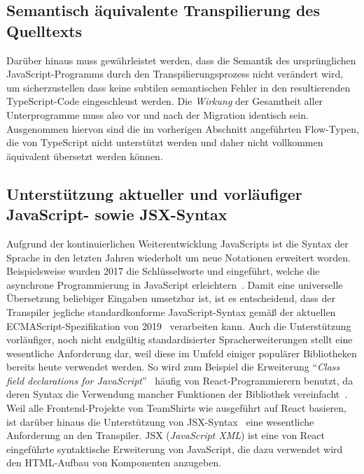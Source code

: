 \subsection{Semantisch äquivalente Transpilierung des Quelltexts}
\label{sec:requirement:semantic-equivalence}

Darüber hinaus muss gewährleistet werden, dass die Semantik des ursprünglichen JavaScript-Programms durch den Transpilierungsprozess nicht verändert wird, um sicherzustellen dass keine subtilen semantischen Fehler in den resultierenden TypeScript-Code eingeschleust werden. Die \emph{Wirkung} der Gesamtheit aller Unterprogramme muss also vor und nach der Migration identisch sein. Ausgenommen hiervon sind die im vorherigen Abschnitt angeführten Flow-Typen, die von TypeScript nicht unterstützt werden und daher nicht vollkommen äquivalent übersetzt werden können.

\subsection{Unterstützung aktueller und vorläufiger JavaScript- sowie JSX-Syntax}
\label{sec:requirement:syntax}

Aufgrund der kontinuierlichen Weiterentwicklung JavaScripts ist die Syntax der Sprache in den letzten Jahren wiederholt um neue Notationen erweitert worden. Beispielsweise wurden 2017 die Schlüsselworte  und  eingeführt, welche die asynchrone Programmierung in JavaScript erleichtern~\autocite[430]{ECMASCRIPT:2017}. Damit eine universelle Übersetzung beliebiger Eingaben umsetzbar ist, ist es entscheidend, dass der Transpiler jegliche standardkonforme JavaScript-Syntax gemäß der aktuellen ECMAScript-Spezifikation von 2019~\autocite{ECMASCRIPT:2019} verarbeiten kann. Auch die Unterstützung vorläufiger, noch nicht endgültig standardisierter Spracherweiterungen stellt eine wesentliche Anforderung dar, weil diese im Umfeld einiger populärer Bibliotheken bereits heute verwendet werden. So wird zum Beispiel die Erweiterung \enquote{\textit{Class field declarations for JavaScript}}~\autocite{ES_PROPOSAL:CLASS_FIELDS} häufig von React-Programmierern benutzt, da deren Syntax die Verwendung mancher Funktionen der Bibliothek vereinfacht~\autocite{REACT:HANDLING_EVENTS}. Weil alle Frontend-Projekte von TeamShirts wie ausgeführt auf React basieren, ist darüber hinaus die Unterstützung von JSX-Syntax~\autocite{SOFTWARE:JSX} eine wesentliche Anforderung an den Transpiler. JSX (\textit{JavaScript XML}) ist eine von React eingeführte syntaktische Erweiterung von JavaScript, die dazu verwendet wird den HTML-Aufbau von Komponenten anzugeben.

